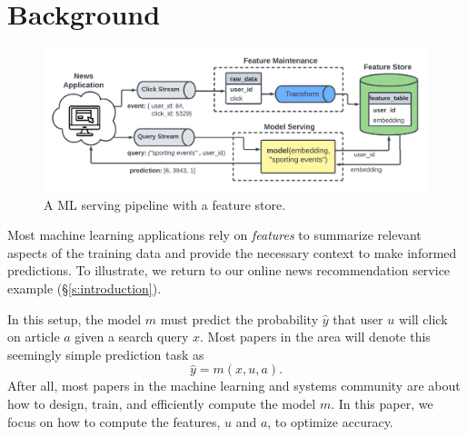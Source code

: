 \section{Background}
\label{s:background}

\begin{figure}[t]
\centering
\includegraphics[width=14cm]{ralf/figures/feature_store.pdf}
\caption{A ML serving pipeline with a feature store. 
}
\label{f:feature-store}
\end{figure}

Most machine learning applications rely on \emph{features} to summarize relevant aspects of the training data and provide the necessary context to make informed predictions.
To illustrate, we return to our 
online news recommendation service example (\S\ref{s:introduction}). 

In this setup, the model $m$ must predict the probability $\hat{y}$ that user $u$ will click on article $a$ given a search query $x$.  
Most papers in the area will denote this seemingly simple prediction task as
\begin{equation}
    \hat{y} = m(x, u, a).
\end{equation}
   
 After all, most papers in the machine learning and systems community are about how to design, train, and efficiently compute the model $m$. 
In this paper, we focus on how to compute the features, $u$ and $a$, to optimize accuracy. 

